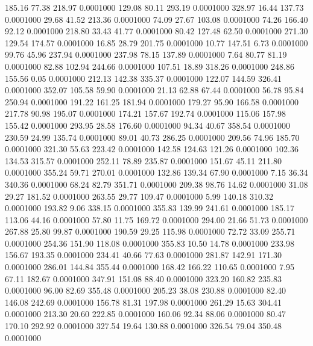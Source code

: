  185.16   77.38  218.97   0.0001000
 129.08   80.11  293.19   0.0001000
 328.97   16.44  137.73   0.0001000
  29.68   41.52  213.36   0.0001000
  74.09   27.67  103.08   0.0001000
  74.26  166.40   92.12   0.0001000
 218.80   33.43   41.77   0.0001000
  80.42  127.48   62.50   0.0001000
 271.30  129.54  174.57   0.0001000
  16.85   28.79  201.75   0.0001000
  10.77  147.51    6.73   0.0001000
  99.76   45.96  237.94   0.0001000
 237.98   78.15  137.89   0.0001000
   7.64   80.77   81.19   0.0001000
  82.88  102.94  244.66   0.0001000
 107.51   18.89  318.26   0.0001000
 248.86  155.56    0.05   0.0001000
 212.13  142.38  335.37   0.0001000
 122.07  144.59  326.41   0.0001000
 352.07  105.58   59.90   0.0001000
  21.13   62.88   67.44   0.0001000
  56.78   95.84  250.94   0.0001000
 191.22  161.25  181.94   0.0001000
 179.27   95.90  166.58   0.0001000
 217.78   90.98  195.07   0.0001000
 174.21  157.67  192.74   0.0001000
 115.06  157.98  155.42   0.0001000
 293.95   28.58  176.60   0.0001000
  94.34   40.67  358.54   0.0001000
 230.59   24.99  135.74   0.0001000
  89.01   40.73  286.25   0.0001000
 209.56   74.96  185.70   0.0001000
 321.30   55.63  223.42   0.0001000
 142.58  124.63  121.26   0.0001000
 102.36  134.53  315.57   0.0001000
 252.11   78.89  235.87   0.0001000
 151.67   45.11  211.80   0.0001000
 355.24   59.71  270.01   0.0001000
 132.86  139.34   67.90   0.0001000
   7.15   36.34  340.36   0.0001000
  68.24   82.79  351.71   0.0001000
 209.38   98.76   14.62   0.0001000
  31.08   29.27  181.52   0.0001000
 263.55   29.77  109.47   0.0001000
   5.99  140.18  310.32   0.0001000
 193.82    9.06  338.15   0.0001000
 355.83  139.99  241.61   0.0001000
 185.17  113.06   44.16   0.0001000
  57.80   11.75  169.72   0.0001000
 294.00   21.66   51.73   0.0001000
 267.88   25.80   99.87   0.0001000
 190.59   29.25  115.98   0.0001000
  72.72   33.09  255.71   0.0001000
 254.36  151.90  118.08   0.0001000
 355.83   10.50   14.78   0.0001000
 233.98  156.67  193.35   0.0001000
 234.41   40.66   77.63   0.0001000
 281.87  142.91  171.30   0.0001000
 286.01  144.84  355.44   0.0001000
 168.42  166.22  110.65   0.0001000
   7.95   67.11  182.67   0.0001000
 347.91  151.08   88.40   0.0001000
 323.20  160.82  235.83   0.0001000
  96.00   82.69  355.48   0.0001000
 205.23   38.08  230.88   0.0001000
  82.40  146.08  242.69   0.0001000
 156.78   81.31  197.98   0.0001000
 261.29   15.63  304.41   0.0001000
 213.30   20.60  222.85   0.0001000
 160.06   92.34   88.06   0.0001000
  80.47  170.10  292.92   0.0001000
 327.54   19.64  130.88   0.0001000
 326.54   79.04  350.48   0.0001000
